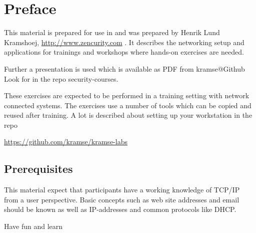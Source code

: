\documentclass[a4paper,11pt,notitlepage]{report}
\begin{document}
\rm
{}

\newcommand{\emne}[1]{Suricata, Bro og DNS Capture workshop}
\newcommand{\kursus}[1]{Suricata, Bro og DNS Capture workshop}
\newcommand{\kursusnavn}[1]{Suricata, Bro og DNS Capture workshop\\ exercises}




\setcounter{tocdepth}{0}

\normal

{\color{titlecolor}\tableofcontents}

\normal
\pagestyle{fancyplain}
\chapter*{\color{titlecolor}Preface}

This material is prepared for use in \emph{\kursus} and was prepared by
Henrik Lund Kramshoej, \url{http://www.zencurity.com} .
It describes the networking setup and
applications for trainings and workshops where hands-on exercises are needed.

\vskip 1cm
Further a presentation is used which is available as PDF from kramse@Github\\
Look for \jobname in the repo security-courses.

These exercises are expected to be performed in a training setting with network connected systems. The exercises use a number of tools which can be copied and reused after training. A lot is described about setting up your workstation in the repo

\url{https://github.com/kramse/kramse-labs}



\section*{\color{titlecolor}Prerequisites}

This material expect that participants have a working knowledge of
TCP/IP from a user perspective. Basic concepts such as web site addresses and email should be known as well as IP-addresses and common protocols like DHCP.

\vskip 1cm
Have fun and learn
\eject

\rhead{\fancyplain{}{\bf \chaptername\ \thechapter}}
\end{document}
